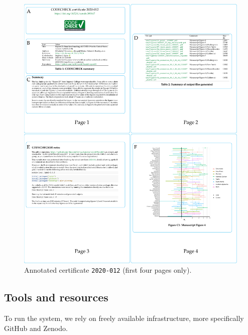\documentclass[12pt]{article}
\begin{document}
\begin{figure}
  \centering
  \includegraphics[width=\textwidth]{figs/annotate-cert-crop.pdf}
  \caption{Annotated certificate \texttt{2020-012} \cite{cert-2020-012} (first four pages only).}
  \label{fig:cert}
\end{figure}

\subsection*{Tools and resources}\label{tools}

To run the system, we rely on freely available infrastructure, more 
specifically GitHub and Zenodo.
\end{document}
